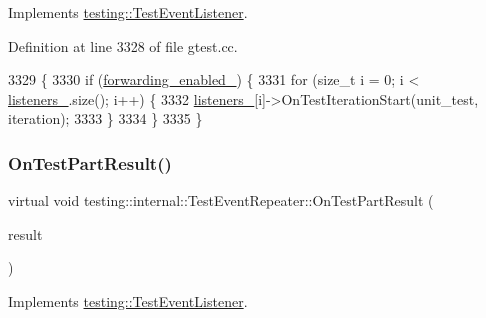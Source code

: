 Implements \hyperlink{classtesting_1_1TestEventListener_a60cc09b7907cb329d152eb5e7133bdeb}{testing\+::\+Test\+Event\+Listener}.



Definition at line 3328 of file gtest.\+cc.


\begin{DoxyCode}
3329                                                             \{
3330   \textcolor{keywordflow}{if} (\hyperlink{classtesting_1_1internal_1_1TestEventRepeater_a1f7e494642d653eaad800504510d18a3}{forwarding\_enabled\_}) \{
3331     \textcolor{keywordflow}{for} (\textcolor{keywordtype}{size\_t} i = 0; i < \hyperlink{classtesting_1_1internal_1_1TestEventRepeater_a1c08e9302639108588d764b671c54825}{listeners\_}.size(); i++) \{
3332       \hyperlink{classtesting_1_1internal_1_1TestEventRepeater_a1c08e9302639108588d764b671c54825}{listeners\_}[i]->OnTestIterationStart(unit\_test, iteration);
3333     \}
3334   \}
3335 \}
\end{DoxyCode}
\mbox{\label{classtesting_1_1internal_1_1TestEventRepeater_ac8fb21da6802b1ebab9cad3eee9150eb}} 
\subsubsection{\texorpdfstring{On\+Test\+Part\+Result()}{OnTestPartResult()}}
{\footnotesize\ttfamily virtual void testing\+::internal\+::\+Test\+Event\+Repeater\+::\+On\+Test\+Part\+Result (\begin{DoxyParamCaption}\item[{const \hyperlink{classtesting_1_1TestPartResult}{Test\+Part\+Result} \&}]{result }\end{DoxyParamCaption})\hspace{0.3cm}{\ttfamily [virtual]}}



Implements \hyperlink{classtesting_1_1TestEventListener_a054f8705c883fa120b91473aff38f2ee}{testing\+::\+Test\+Event\+Listener}.

\mbox{\label{classtesting_1_1internal_1_1TestEventRepeater_a4622616259747dbcc23f5ee39ef99ec0}} 
